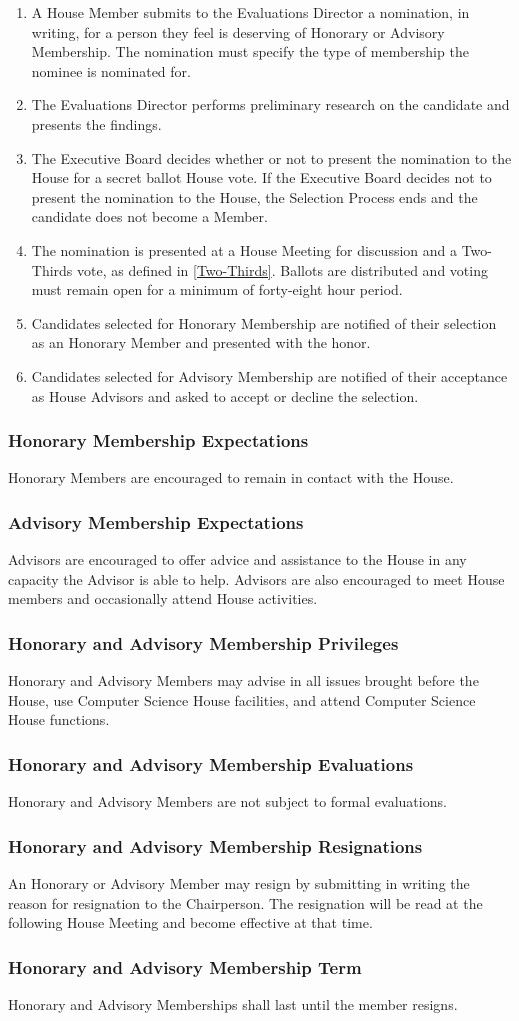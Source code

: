 \documentclass{article}
\newcommand{\asubsection}[1]{\subsubsection{#1} \label{#1}}
\begin{document}
\begin{enumerate}
	\item A House Member submits to the Evaluations Director a nomination, in writing, for a person they feel is deserving of Honorary or Advisory Membership. The nomination must specify the type of membership the nominee is nominated for.
	\item The Evaluations Director performs preliminary research on the candidate and presents the findings.
	\item The Executive Board decides whether or not to present the nomination to the House for a secret ballot House vote.
		If the Executive Board decides not to present the nomination to the House, the Selection Process ends and the candidate does not become a Member.
	\item The nomination is presented at a House Meeting for discussion and a Two-Thirds vote, as defined in \ref{Two-Thirds}.
		Ballots are distributed and voting must remain open for a minimum of forty-eight hour period.
	\item Candidates selected for Honorary Membership are notified of their selection as an Honorary Member and presented with the honor.
    \item Candidates selected for Advisory Membership are notified of their acceptance as House Advisors and asked to accept or decline
        the selection.
\end{enumerate}
\asubsection{Honorary Membership Expectations}
Honorary Members are encouraged to remain in contact with the House.
\asubsection{Advisory Membership Expectations}
Advisors are encouraged to offer advice and assistance to the House in any capacity the Advisor is able to help.
Advisors are also encouraged to meet House members and occasionally attend House activities.
\asubsection{Honorary and Advisory Membership Privileges}
Honorary and Advisory Members may advise in all issues brought before the House, use Computer Science House facilities, and attend Computer Science House functions.
\asubsection{Honorary and Advisory Membership Evaluations}
Honorary and Advisory Members are not subject to formal evaluations.
\asubsection{Honorary and Advisory Membership Resignations}
An Honorary or Advisory Member may resign by submitting in writing the reason for resignation to the Chairperson.
The resignation will be read at the following House Meeting and become effective at that time.
\asubsection{Honorary and Advisory Membership Term}
Honorary and Advisory Memberships shall last until the member resigns.
\end{document}
